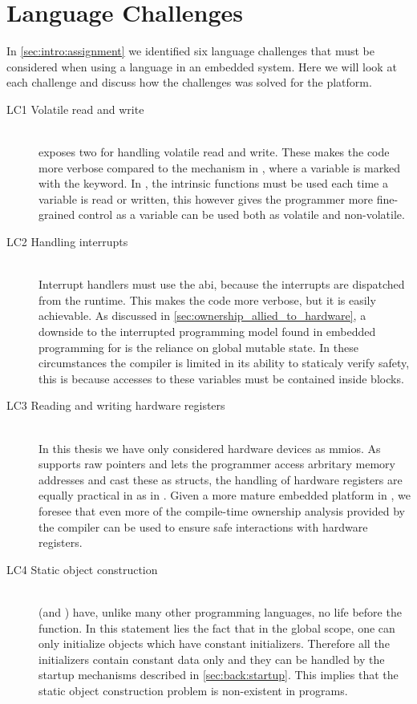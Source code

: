 \section{Language Challenges}
\label{sec:disc:lang-challenges}

In \autoref{sec:intro:assignment} we identified six language challenges that must be considered when using a language in an embedded system.
Here we will look at each challenge and discuss how the challenges was solved for the {\rg} platform.

\begin{description}
\item [LC1 Volatile read and write] \hfill \\
  {\rust} exposes two  for handling volatile read and write.
  These makes the code more verbose compared to the mechanism in {\C}, where a variable is marked with the  keyword.
  In {\rust}, the intrinsic functions must be used each time a variable is read or written, this however gives the programmer more fine-grained control as a variable can be used both as volatile and non-volatile.

\item [LC2 Handling interrupts] \hfill \\
  Interrupt handlers must use the {\C} \gls{abi}, because the interrupts are dispatched from the {\C} runtime.
  This makes the code more verbose, but it is easily achievable.
  As discussed in \autoref{sec:ownership_allied_to_hardware}, a downside to the interrupted programming model found in embedded programming for {\rust} is the reliance on global mutable state.
  In these circumstances the compiler is limited in its ability to staticaly verify safety, this is because accesses to these variables must be contained inside {\unsafe} blocks.

\item [LC3 Reading and writing hardware registers] \hfill \\
  In this thesis we have only considered hardware devices as \glspl{mmio}.
  As {\rust} supports raw pointers and lets the programmer access arbritary memory addresses and cast these as structs, the handling of hardware registers are equally practical in {\rust} as in {\C}.
  Given a more mature embedded platform in {\rust}, we foresee that even more of the compile-time ownership analysis provided by the {\rust} compiler can be used to ensure safe interactions with hardware registers.

\item [LC4 Static object construction] \hfill \\
  {\rust} (and {\C}) have, unlike many other programming languages, no life before the {\main} function.
  In this statement lies the fact that in the global scope, one can only initialize objects which have constant initializers.
  Therefore all the initializers contain constant data only and they can be handled by the startup mechanisms described in \autoref{sec:back:startup}.
  This implies that the static object construction problem is non-existent in {\rust} programs.


\end{description}
